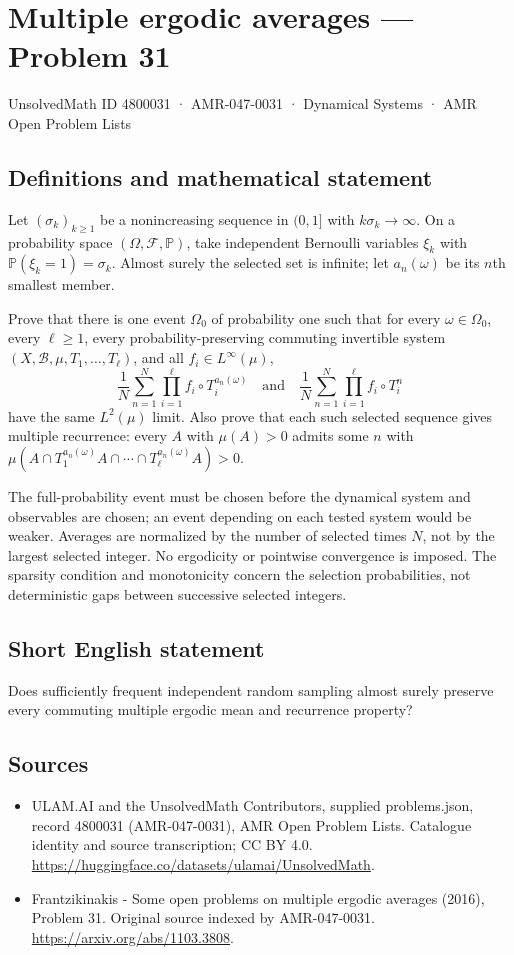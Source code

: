 \documentclass[11pt,a4paper]{article}
\begin{document}
\section*{Multiple ergodic averages — Problem 31}\label{4800031}
{\small UnsolvedMath ID 4800031 · AMR-047-0031 · Dynamical Systems · AMR Open Problem Lists}
\subsection{Definitions and mathematical statement}
Let $(\sigma_k)_{k\ge1}$ be a nonincreasing
sequence in $(0,1]$ with $k\sigma_k\to\infty$.
On a probability space $(\Omega,\mathcal F,\mathbb P)$,
take independent Bernoulli variables $\xi_k$
with $\mathbb P(\xi_k=1)=\sigma_k$.
Almost surely the selected set is infinite;
let $a_n(\omega)$ be its $n$th smallest member.

Prove that there is one event $\Omega_0$ of
probability one such that for every
$\omega\in\Omega_0$, every $\ell\ge1$, every
probability-preserving commuting invertible system
$(X,\mathcal B,\mu,T_1,\ldots,T_\ell)$, and all
$f_i\in L^\infty(\mu)$,
\[
 \frac1N\sum_{n=1}^N\prod_{i=1}^\ell f_i\circ T_i^{a_n(\omega)}
 \quad\text{and}\quad
 \frac1N\sum_{n=1}^N\prod_{i=1}^\ell f_i\circ T_i^n
\]
have the same $L^2(\mu)$ limit. Also prove
that each such selected sequence gives multiple
recurrence: every $A$ with $\mu(A)>0$ admits
some $n$ with
$\mu(A\cap T_1^{a_n(\omega)}A\cap\cdots
\cap T_\ell^{a_n(\omega)}A)>0$.

The full-probability event must be chosen before
the dynamical system and observables are chosen;
an event depending on each tested system would
be weaker. Averages are normalized by the
number of selected times $N$, not by the
largest selected integer. No ergodicity or
pointwise convergence is imposed. The sparsity
condition and monotonicity concern the selection
probabilities, not deterministic gaps between
successive selected integers.
\subsection{Short English statement}
Does sufficiently frequent independent random sampling almost surely preserve every commuting multiple ergodic mean and recurrence property?
\subsection{Sources}
\begin{itemize}
\item[S1] ULAM.AI and the UnsolvedMath Contributors, supplied problems.json, record 4800031 (AMR-047-0031), AMR Open Problem Lists. Catalogue identity and source transcription; CC BY 4.0.
\url{https://huggingface.co/datasets/ulamai/UnsolvedMath}.
\item[S2] Frantzikinakis - Some open problems on multiple ergodic averages (2016), Problem 31. Original source indexed by AMR-047-0031.
\url{https://arxiv.org/abs/1103.3808}.
\end{itemize}
\end{document}
